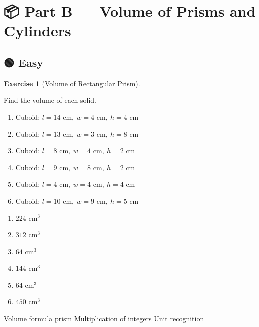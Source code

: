 \documentclass[
  letterpaper,
  DIV=11,
  numbers=noendperiod]{scrreprt}
\theoremstyle{definition}
\newtheorem{exercise}{Exercise}[chapter]
\theoremstyle{remark}
\begin{document}
\section{📦 Part B --- Volume of Prisms and Cylinders}\label{sec-volume}

\subsection{🟢 Easy}

\begin{exercise}[Volume of Rectangular
Prism]\protect\hypertarget{exr-vol-1}{}\label{exr-vol-1}

Find the volume of each solid.

\begin{enumerate}
\def\labelenumi{\alph{enumi})}
\item
  \(\text{Cuboid: }l=14\text{ cm},\ w=4\text{ cm},\ h=4\text{ cm}\)
\item
  \(\text{Cuboid: }l=13\text{ cm},\ w=3\text{ cm},\ h=8\text{ cm}\)
\item
  \(\text{Cuboid: }l=8\text{ cm},\ w=4\text{ cm},\ h=2\text{ cm}\)
\item
  \(\text{Cuboid: }l=9\text{ cm},\ w=8\text{ cm},\ h=2\text{ cm}\)
\item
  \(\text{Cuboid: }l=4\text{ cm},\ w=4\text{ cm},\ h=4\text{ cm}\)
\item
  \(\text{Cuboid: }l=10\text{ cm},\ w=9\text{ cm},\ h=5\text{ cm}\)
\end{enumerate}

\begin{tcolorbox}[enhanced jigsaw, opacitybacktitle=0.6, coltitle=black, arc=.35mm, colframe=quarto-callout-tip-color-frame, colback=white, bottomrule=.15mm, left=2mm, colbacktitle=quarto-callout-tip-color!10!white, titlerule=0mm, opacityback=0, title=\textcolor{quarto-callout-tip-color}{\faLightbulb}\hspace{0.5em}{🔍 View Solution}, leftrule=.75mm, breakable, rightrule=.15mm, bottomtitle=1mm, toptitle=1mm, toprule=.15mm]

\begin{enumerate}
\def\labelenumi{\alph{enumi})}
\item
  \(224\text{ cm}^3\)
\item
  \(312\text{ cm}^3\)
\item
  \(64\text{ cm}^3\)
\item
  \(144\text{ cm}^3\)
\item
  \(64\text{ cm}^3\)
\item
  \(450\text{ cm}^3\)
\end{enumerate}

\end{tcolorbox}

{Volume formula prism} {Multiplication of integers} {Unit recognition}

\end{exercise}
\end{document}
